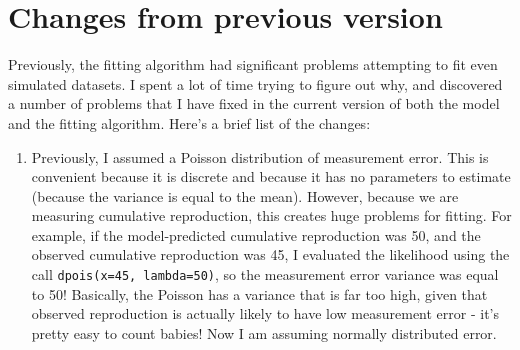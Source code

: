 \documentclass[12pt,reqno,final,pdftex]{amsart}\usepackage[]{graphicx}\usepackage[]{color}
\theoremstyle{plain}
\numberwithin{equation}{part}
\begin{document}
\section*{Changes from previous version}

Previously, the fitting algorithm had significant problems attempting to fit even simulated datasets.
I spent a lot of time trying to figure out why, and discovered a number of problems that I have fixed in the current version of both the model and the fitting algorithm.
Here's a brief list of the changes:
\begin{enumerate}
\item Previously, I assumed a Poisson distribution of measurement error. This is convenient because it is discrete and because it has no parameters to estimate (because the variance is equal to the mean). However, because we are measuring cumulative reproduction, this creates huge problems for fitting. For example, if the model-predicted cumulative reproduction was 50, and the observed cumulative reproduction was 45, I evaluated the likelihood using the call \texttt{dpois(x=45, lambda=50)}, so the measurement error variance was equal to 50! Basically, the Poisson has a variance that is far too high, given that observed reproduction is actually likely to have low measurement error - it's pretty easy to count babies! Now I am assuming normally distributed error.

\end{enumerate}
\end{document}
